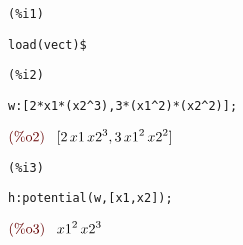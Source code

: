 \noindent
\begin{minipage}[t]{8ex}
\color{red}\bf
\begin{verbatim}
(%i1) 
\end{verbatim}
\end{minipage}
\begin{minipage}[t]{\textwidth}
\color{blue}
\begin{verbatim}
load(vect)$
\end{verbatim}
\end{minipage}


\noindent
\begin{minipage}[t]{8ex}
\color{red}\bf
\begin{verbatim}
(%i2) 
\end{verbatim}
\end{minipage}
\begin{minipage}[t]{\textwidth}
\color{blue}
\begin{verbatim}
w:[2*x1*(x2^3),3*(x1^2)*(x2^2)];
\end{verbatim}
\end{minipage}
\begin{math}\displaystyle
\parbox{8ex}{\color{labelcolor}(\%o2) }
[2\,x1\,{x2}^{3},3\,{x1}^{2}\,{x2}^{2}]
\end{math}


\noindent
\begin{minipage}[t]{8ex}
\color{red}\bf
\begin{verbatim}
(%i3) 
\end{verbatim}
\end{minipage}
\begin{minipage}[t]{\textwidth}
\color{blue}
\begin{verbatim}
h:potential(w,[x1,x2]);
\end{verbatim}
\end{minipage}
\begin{math}\displaystyle
\parbox{8ex}{\color{labelcolor}(\%o3) }
{x1}^{2}\,{x2}^{3}
\end{math}

